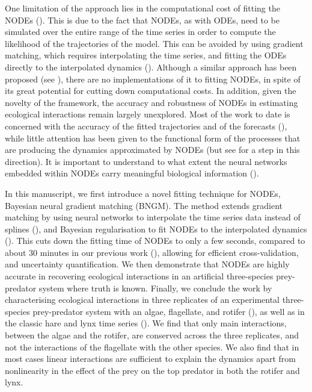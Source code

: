 \documentclass[11pt, oneside]{article}
\begin{document}
One limitation of the approach lies in the computational cost of fitting the NODEs (\cite{Chen2018,Bonnaffe2021a}).
This is due to the fact that NODEs, as with ODEs, need to be simulated over the entire range of the time series in order to compute the likelihood of the trajectories of the model.
This can be avoided by using gradient matching, which requires interpolating the time series, and fitting the ODEs directly to the interpolated dynamics (\cite{Jost2000,Aarts2001,Ellner2002}).
Although a similar approach has been proposed (see \cite{Treven2021}), there are no implementations of it to fitting NODEs, in spite of its great potential for cutting down computational costs.
In addition, given the novelty of the framework, the accuracy and robustness of NODEs in estimating ecological interactions remain largely unexplored.
Most of the work to date is concerned with the accuracy of the fitted trajectories and of the forecasts (\cite{Mai2016,Treven2021,Frank2022}), while little attention has been given to the functional form of the processes that are producing the dynamics approximated by NODEs (but see \cite{Hu2020} for a step in this direction).
It is important to understand to what extent the neural networks embedded within NODEs carry meaningful biological information (\cite{Novak2021}).

In this manuscript, we first introduce a novel fitting technique for NODEs, Bayesian neural gradient matching (BNGM). 
The method extends gradient matching by using neural networks to interpolate the time series data instead of splines (\cite{Ellner2002}), and Bayesian regularisation to fit NODEs to the interpolated dynamics (\cite{Cawley2007}). 
This cuts down the fitting time of NODEs to only a few seconds, compared to about 30 minutes in our previous work (\cite{Bonnaffe2021a}), allowing for efficient cross-validation, and uncertainty quantification.
We then demonstrate that NODEs are highly accurate in recovering ecological interactions in an artificial three-species prey-predator system where truth is known.
Finally, we conclude the work by characterising ecological interactions in three replicates of an experimental three-species prey-predator system with an algae, flagellate, and rotifer (\cite{Hiltunen2013}), as well as in the classic hare and lynx time series (\cite{Odum1972}).
We find that only main interactions, between the algae and the rotifer, are conserved across the three replicates, and not the interactions of the flagellate with the other species.
We also find that in most cases linear interactions are sufficient to explain the dynamics apart from nonlinearity in the effect of the prey on the top predator in both the rotifer and lynx.
\end{document}
